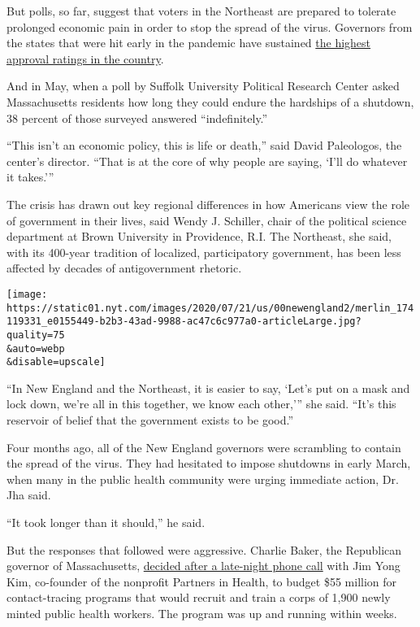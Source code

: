 But polls, so far, suggest that voters in the Northeast are prepared to
tolerate prolonged economic pain in order to stop the spread of the
virus. Governors from the states that were hit early in the pandemic
have sustained
\href{https://covidstates.net/COVID19\%20CONSORTIUM\%20REPORT\%20APPROVAL\%20JULY\%202020.pdf}{the
highest approval ratings in the country}.

And in May, when a poll by Suffolk University Political Research Center
asked Massachusetts residents how long they could endure the hardships
of a shutdown, 38 percent of those surveyed answered ``indefinitely.''

``This isn't an economic policy, this is life or death,'' said David
Paleologos, the center's director. ``That is at the core of why people
are saying, `I'll do whatever it takes.'''

The crisis has drawn out key regional differences in how Americans view
the role of government in their lives, said Wendy J. Schiller, chair of
the political science department at Brown University in Providence, R.I.
The Northeast, she said, with its 400-year tradition of localized,
participatory government, has been less affected by decades of
antigovernment rhetoric.

\texttt{[image: https://static01.nyt.com/images/2020/07/21/us/00newengland2/merlin\_174119331\_e0155449-b2b3-43ad-9988-ac47c6c977a0-articleLarge.jpg?quality=75\\\&auto=webp\\\&disable=upscale]}

``In New England and the Northeast, it is easier to say, `Let's put on a
mask and lock down, we're all in this together, we know each other,'''
she said. ``It's this reservoir of belief that the government exists to
be good.''

Four months ago, all of the New England governors were scrambling to
contain the spread of the virus. They had hesitated to impose shutdowns
in early March, when many in the public health community were urging
immediate action, Dr. Jha said.

``It took longer than it should,'' he said.

But the responses that followed were aggressive. Charlie Baker, the
Republican governor of Massachusetts,
\href{https://www.nytimes.com/2020/04/16/us/coronavirus-massachusetts-contact-tracing.html}{decided
after a late-night phone call} with Jim Yong Kim, co-founder of the
nonprofit Partners in Health, to budget \$55 million for contact-tracing
programs that would recruit and train a corps of 1,900 newly minted
public health workers. The program was up and running within weeks.

